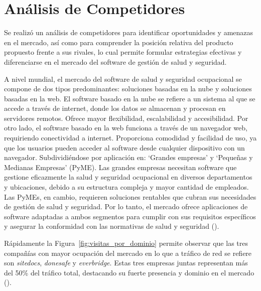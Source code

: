 \section{Análisis de Competidores}

Se realizó un análisis de competidores para identificar oportunidades y amenazas en el mercado, así como para comprender la posición relativa del producto propuesto frente a sus rivales, lo cual permite formular estrategias efectivas y diferenciarse en el mercado del software de gestión de salud y seguridad. 

A nivel mundial, el mercado del software de salud y seguridad ocupacional se compone de dos tipos predominantes: soluciones basadas en la nube y soluciones basadas en la web. El software basado en la nube se refiere a un sistema al que se accede a través de internet, donde los datos se almacenan y procesan en servidores remotos. Ofrece mayor flexibilidad, escalabilidad y accesibilidad. Por otro lado, el software basado en la web funciona a través de un navegador web, requiriendo conectividad a internet. Proporciona comodidad y facilidad de uso, ya que los usuarios pueden acceder al software desde cualquier dispositivo con un navegador. Subdividiéndose por aplicación en: `Grandes empresas' y `Pequeñas y Medianas Empresas' (PyME). Las grandes empresas necesitan software que gestione eficazmente la salud y seguridad ocupacional en diversos departamentos y ubicaciones, debido a su estructura compleja y mayor cantidad de empleados. Las PyMEs, en cambio, requieren soluciones rentables que cubran sus necesidades de gestión de salud y seguridad. Por lo tanto, el mercado ofrece aplicaciones de software adaptadas a ambos segmentos para cumplir con sus requisitos específicos y asegurar la conformidad con las normativas de salud y seguridad (\cite{KingpinMarketResearch}).

Rápidamente la Figura~\ref{fig:visitas_por_dominio} permite observar que las tres compañías con mayor ocupación del mercado en lo que a tráfico de red se refiere son \textit{sitedocs}, \textit{donesafe} y \textit{everbridge}. Estas tres empresas juntas representan más del 50\% del tráfico total, destacando su fuerte presencia y dominio en el mercado (\cite{SEMrushMarketExplorer}).


